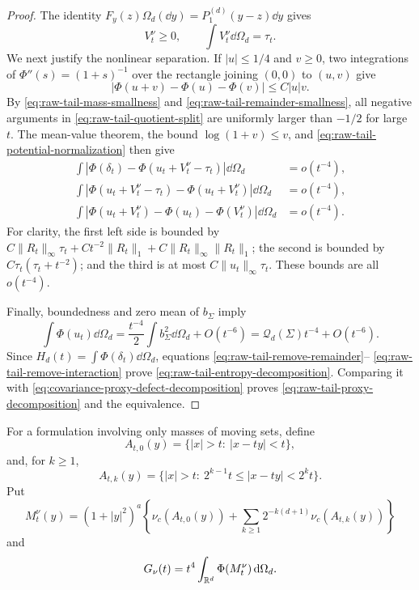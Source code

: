 \begin{proof}
The identity
\(F_y(z)\Omega_d(\dd y)=P_1^{(d)}(y-z)\dd y\) gives
\begin{equation}\label{eq:raw-tail-potential-normalization}
 V_t^\nu\ge0,
 \qquad \int V_t^\nu\dd\Omega_d=\tau_t.
\end{equation}
We next justify the nonlinear separation.  If \(|u|\le1/4\) and \(v\ge0\),
two integrations of \(\Phi''(s)=(1+s)^{-1}\) over the rectangle joining
\((0,0)\) to \((u,v)\) give
\begin{equation}\label{eq:raw-tail-phi-interaction}
 |\Phi(u+v)-\Phi(u)-\Phi(v)|\le C|u|v.
\end{equation}
By \eqref{eq:raw-tail-mass-smallness} and
\eqref{eq:raw-tail-remainder-smallness}, all negative arguments in
\eqref{eq:raw-tail-quotient-split} are uniformly larger than \(-1/2\) for
large \(t\).  The mean-value theorem, the bound
\(\log(1+v)\le v\), and \eqref{eq:raw-tail-potential-normalization} then give
\begin{align}
 \int|\Phi(\delta_t)-
 \Phi(u_t+V_t^\nu-\tau_t)|\dd\Omega_d&=o(t^{-4}),
 \label{eq:raw-tail-remove-remainder}\\
 \int|\Phi(u_t+V_t^\nu-\tau_t)-
 \Phi(u_t+V_t^\nu)|\dd\Omega_d&=o(t^{-4}),
 \label{eq:raw-tail-remove-mass}\\
 \int|\Phi(u_t+V_t^\nu)-\Phi(u_t)-
 \Phi(V_t^\nu)|\dd\Omega_d&=o(t^{-4}).
 \label{eq:raw-tail-remove-interaction}
\end{align}
For clarity, the first left side is bounded by
\(C\|R_t\|_\infty\tau_t+C t^{-2}\|R_t\|_1
 +C\|R_t\|_\infty\|R_t\|_1\); the second is bounded by
\(C\tau_t(\tau_t+t^{-2})\); and the third is at most
\(C\|u_t\|_\infty\tau_t\).  These bounds are all \(o(t^{-4})\).

Finally, boundedness and zero mean of \(b_\Sigma\) imply
\[
 \int\Phi(u_t)\dd\Omega_d
 =\frac{t^{-4}}2\int b_\Sigma^2\dd\Omega_d+O(t^{-6})
 =\mathcal Q_d(\Sigma)t^{-4}+O(t^{-6}).
\]
Since \(H_d(t)=\int\Phi(\delta_t)\dd\Omega_d\), equations
\eqref{eq:raw-tail-remove-remainder}--
\eqref{eq:raw-tail-remove-interaction} prove
\eqref{eq:raw-tail-entropy-decomposition}.  Comparing it with
\eqref{eq:covariance-proxy-defect-decomposition} proves
\eqref{eq:raw-tail-proxy-decomposition} and the equivalence.
\end{proof}

For a formulation involving only masses of moving sets, define
\[
 A_{t,0}(y)=\{|x|>t:\ |x-ty|<t\},
\]
and, for \(k\ge1\),
\[
 A_{t,k}(y)=\{|x|>t:\ 2^{k-1}t\le|x-ty|<2^kt\}.
\]
Put
\begin{equation}\label{eq:moving-annulus-tail-functional}
 M_t^\nu(y)=(1+|y|^2)^a\left\{
 \nu_c(A_{t,0}(y))+
 \sum_{k\ge1}2^{-k(d+1)}\nu_c(A_{t,k}(y))\right\}
\end{equation}
and
\begin{equation}\label{eq:moving-annulus-tail-energy}
 G_\nu(t)=t^4\int_{\mathbb{R}^d}\Phi(M_t^\nu)\,\mathrm{d}\Omega_d.
\end{equation}


